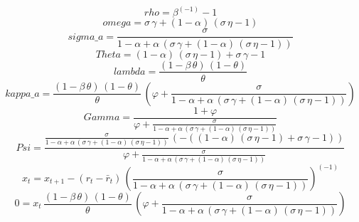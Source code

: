 \begin{dmath*}
rho = {\beta}^{\left(-1\right)}-1
\end{dmath*}
\begin{dmath*}
omega = {\sigma}\, {\gamma}+\left(1-{\alpha}\right)\, \left({\sigma}\, {\eta}-1\right)
\end{dmath*}
\begin{dmath*}
sigma\_a = \frac{{\sigma}}{1-{\alpha}+{\alpha}\, \left({\sigma}\, {\gamma}+\left(1-{\alpha}\right)\, \left({\sigma}\, {\eta}-1\right)\right)}
\end{dmath*}
\begin{dmath*}
Theta = \left(1-{\alpha}\right)\, \left({\sigma}\, {\eta}-1\right)+{\sigma}\, {\gamma}-1
\end{dmath*}
\begin{dmath*}
lambda = \frac{\left(1-{\beta}\, {\theta}\right)\, \left(1-{\theta}\right)}{{\theta}}
\end{dmath*}
\begin{dmath*}
kappa\_a = \frac{\left(1-{\beta}\, {\theta}\right)\, \left(1-{\theta}\right)}{{\theta}}\, \left({\varphi}+\frac{{\sigma}}{1-{\alpha}+{\alpha}\, \left({\sigma}\, {\gamma}+\left(1-{\alpha}\right)\, \left({\sigma}\, {\eta}-1\right)\right)}\right)
\end{dmath*}
\begin{dmath*}
Gamma = \frac{1+{\varphi}}{{\varphi}+\frac{{\sigma}}{1-{\alpha}+{\alpha}\, \left({\sigma}\, {\gamma}+\left(1-{\alpha}\right)\, \left({\sigma}\, {\eta}-1\right)\right)}}
\end{dmath*}
\begin{dmath*}
Psi = \frac{\frac{{\sigma}}{1-{\alpha}+{\alpha}\, \left({\sigma}\, {\gamma}+\left(1-{\alpha}\right)\, \left({\sigma}\, {\eta}-1\right)\right)}\, \left(-\left(\left(1-{\alpha}\right)\, \left({\sigma}\, {\eta}-1\right)+{\sigma}\, {\gamma}-1\right)\right)}{{\varphi}+\frac{{\sigma}}{1-{\alpha}+{\alpha}\, \left({\sigma}\, {\gamma}+\left(1-{\alpha}\right)\, \left({\sigma}\, {\eta}-1\right)\right)}}
\end{dmath*}
\begin{dmath}
{x}_{t}={x}_{t+1}-\left({r}_{t}-{{\bar r}}_{t}\right)\, \left(\frac{{\sigma}}{1-{\alpha}+{\alpha}\, \left({\sigma}\, {\gamma}+\left(1-{\alpha}\right)\, \left({\sigma}\, {\eta}-1\right)\right)}\right)^{\left(-1\right)}
\end{dmath}
\begin{dmath}
0={x}_{t}\, \frac{\left(1-{\beta}\, {\theta}\right)\, \left(1-{\theta}\right)}{{\theta}}\, \left({\varphi}+\frac{{\sigma}}{1-{\alpha}+{\alpha}\, \left({\sigma}\, {\gamma}+\left(1-{\alpha}\right)\, \left({\sigma}\, {\eta}-1\right)\right)}\right)
\end{dmath}
